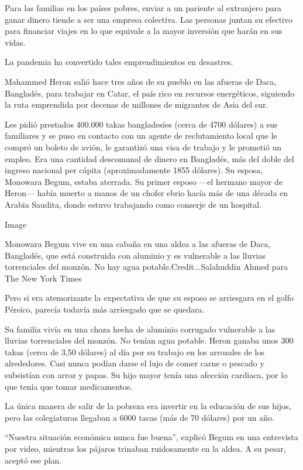 Para las familias en los países pobres, enviar a un pariente al
extranjero para ganar dinero tiende a ser una empresa colectiva. Las
personas juntan su efectivo para financiar viajes en lo que equivale a
la mayor inversión que harán en sus vidas.

La pandemia ha convertido tales emprendimientos en desastres.

Mahammed Heron salió hace tres años de su pueblo en las afueras de Daca,
Bangladés, para trabajar en Catar, el país rico en recursos energéticos,
siguiendo la ruta emprendida por decenas de millones de migrantes de
Asia del sur.

Les pidió prestados 400.000 takas bangladesíes (cerca de 4700 dólares) a
sus familiares y se puso en contacto con un agente de reclutamiento
local que le compró un boleto de avión, le garantizó una visa de trabajo
y le prometió un empleo. Era una cantidad descomunal de dinero en
Bangladés, más del doble del ingreso nacional per cápita
(aproximadamente 1855 dólares). Su esposa, Monowara Begum, estaba
aterrada. Su primer esposo ---el hermano mayor de Heron--- había muerto
a manos de un chofer ebrio hacía más de una década en Arabia Saudita,
donde estuvo trabajando como conserje de un hospital.

Image

Monowara Begum vive en una cabaña en una aldea a las afueras de Daca,
Bangladés, que está construida con aluminio y es vulnerable a las
lluvias torrenciales del monzón. No hay agua potable.Credit...Salahuddin
Ahmed para The New York Times

Pero si era atemorizante la expectativa de que su esposo se arriesgara
en el golfo Pérsico, parecía todavía más arriesgado que se quedara.

Su familia vivía en una choza hecha de aluminio corrugado vulnerable a
las lluvias torrenciales del monzón. No tenían agua potable. Heron
ganaba unos 300 takas (cerca de 3,50 dólares) al día por su trabajo en
los arrozales de los alrededores. Casi nunca podían darse el lujo de
comer carne o pescado y subsistían con arroz y papas. Su hijo mayor
tenía una afección cardiaca, por lo que tenía que tomar medicamentos.

La única manera de salir de la pobreza era invertir en la educación de
sus hijos, pero las colegiaturas llegaban a 6000 tacas (más de 70
dólares) por un año.

``Nuestra situación económica nunca fue buena'', explicó Begum en una
entrevista por video, mientras los pájaros trinaban ruidosamente en la
aldea. A su pesar, aceptó ese plan.

